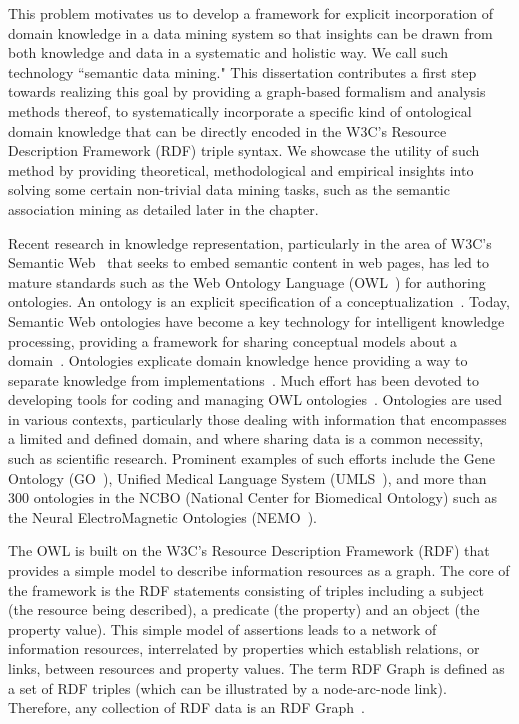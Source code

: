 This problem motivates us to develop a framework for explicit incorporation of domain knowledge in a data mining system so that insights can be drawn from both knowledge and data in a systematic and holistic way. We call such technology ``semantic data mining." This dissertation contributes a first step towards realizing this goal by providing a graph-based formalism and analysis methods thereof, to systematically incorporate a specific kind of ontological domain knowledge that can be directly encoded in the W3C's Resource Description Framework (RDF) triple syntax. We showcase the utility of such method by providing theoretical, methodological and empirical insights into solving some certain non-trivial data mining tasks, such as the semantic association mining as detailed later in the chapter.


Recent research in knowledge representation, particularly in the area of W3C's Semantic Web~\cite{Berners-Lee01} that seeks to embed semantic content in web pages, has led to mature standards such as the Web Ontology Language (OWL~\cite{OWL}) for authoring ontologies. An ontology is an explicit specification of a conceptualization~\cite{Gruber93}. Today, Semantic Web ontologies have become a key technology for intelligent knowledge processing, providing a framework for sharing conceptual models about a domain~\cite{Maedche03Onto}. Ontologies explicate domain knowledge hence providing a way to separate knowledge from implementations~\cite{Noy01ontologydevelopment}. Much effort has been devoted to developing tools for coding and managing OWL ontologies~\cite{Duineveld00, Knublauch04}. Ontologies are used in various contexts, particularly those dealing with information that encompasses a limited and defined domain, and where sharing data is a common necessity, such as scientific research. Prominent examples of such efforts include the Gene Ontology (GO~\cite{GO}), Unified Medical Language System (UMLS~\cite{UMLS}), and more than 300 ontologies in the NCBO (National Center for Biomedical Ontology) such as the Neural ElectroMagnetic Ontologies (NEMO~\cite{FrishkoffEtal07, FrishkoffEtal09}).


The OWL is built on the W3C's Resource Description Framework (RDF) that provides a simple model to describe information resources as a graph. The core of the framework is the RDF statements consisting of triples including a subject (the resource being described), a predicate (the property) and an object (the property value). This simple model of assertions leads to a network of information resources, interrelated by properties which establish relations, or links, between resources and property values. The term RDF Graph is defined as a set of RDF triples (which can be illustrated by a node-arc-node link). Therefore, any collection of RDF data is an RDF Graph~\cite{GraphModelRDF}.

